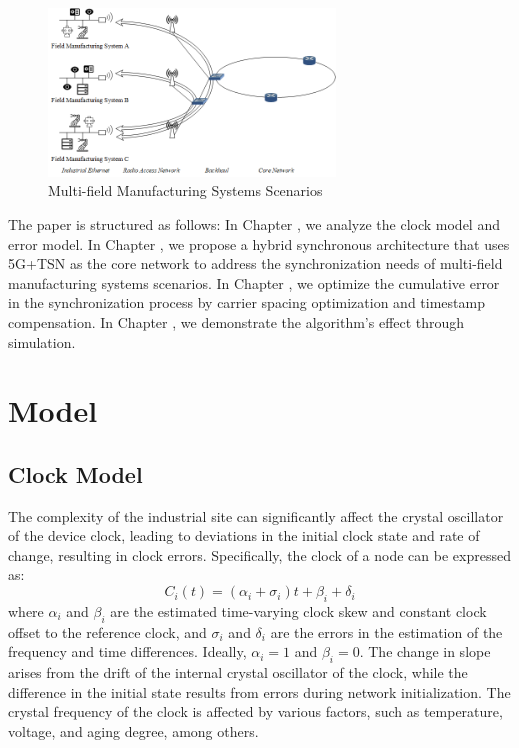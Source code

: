 \documentclass[english]{cccconf}
\begin{document}
\begin{figure}[htbp]
	\centering
	\setcounter{figure}{0}
	\includegraphics[width=3in]{fig11.png}
	\caption{Multi-field Manufacturing Systems Scenarios}
\end{figure}

The paper is structured as follows: In Chapter \uppercase\expandafter{}, we analyze the clock model and error model. In Chapter \uppercase\expandafter{}, we propose a hybrid synchronous architecture that uses 5G+TSN as the core network to address the synchronization needs of multi-field manufacturing systems scenarios. In Chapter \uppercase\expandafter{}, we optimize the cumulative error in the synchronization process by carrier spacing optimization and timestamp compensation. In Chapter \uppercase\expandafter{}, we demonstrate the algorithm's effect through simulation.

\section{Model}

\subsection{Clock Model}
The complexity of the industrial site can significantly affect the crystal oscillator of the device clock, leading to deviations in the initial clock state and rate of change, resulting in clock errors. Specifically, the clock of a node can be expressed as:
\begin{equation}
	C_i(t) = (\alpha _i+\sigma_i)t + \beta _i +\delta_i
\end{equation}
where $\alpha_i$ and $\beta_i$ are the estimated time-varying clock skew and constant clock offset to the reference clock, and $\sigma_i$ and $\delta_i$ are the errors in the estimation of the frequency and time differences. Ideally, $\alpha_i = 1$ and $\beta_i = 0$. The change in slope arises from the drift of the internal crystal oscillator of the clock, while the difference in the initial state results from errors during network initialization. The crystal frequency of the clock is affected by various factors, such as temperature, voltage, and aging degree, among others.
\end{document}

